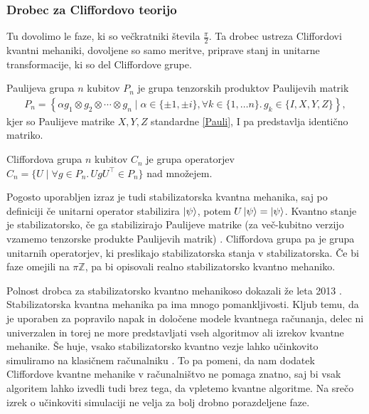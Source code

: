 \documentclass[mat1]{fmfdelo}
\newcommand{\Z}{\mathbb Z}
\newcommand{\tranp}{\top}
\newcommand{\sep}{\ensuremath{.\,}}
\begin{document}
\subsubsection{Drobec za Cliffordovo teorijo}
Tu dovolimo le faze, ki so večkratniki števila \(\frac\pi2\). Ta drobec ustreza Cliffordovi kvantni mehaniki, dovoljene so samo meritve, priprave stanj in unitarne transformacije, ki so del Cliffordove grupe.
\begin{definicija}
    Paulijeva grupa \(n\) kubitov \(P_n\) je grupa tenzorskih produktov Paulijevih matrik
    \begin{align*}
        P_n = \left\{\alpha g_1\otimes g_2\otimes\cdots\otimes g_n \mid \alpha\in\{\pm 1, \pm i\}, \forall k\in\{1,\ldots n\}\sep g_k\in \{I,X,Y,Z\}\right\},
    \end{align*}
    kjer so Paulijeve matrike \(X,Y,Z\) standardne \ref{Pauli}, I pa predstavlja identično matriko.
\end{definicija}
\begin{definicija}
    Cliffordova grupa \(n\) kubitov \(C_n\) je grupa operatorjev \(C_n=\{U\mid \forall g\in P_n\sep UgU^\tranp\in P_n\}\) nad množejem.
\end{definicija}
Pogosto uporabljen izraz je tudi stabilizatorska kvantna mehanika, saj po definiciji če unitarni operator stabilizira \(\ket \psi\), potem \(U\ket\psi = \ket\psi\). Kvantno stanje je stabilizatorsko, če ga stabilizirajo Paulijeve matrike (za več-kubitno verzijo vzamemo tenzorske produkte Paulijevih matrik) \cite{Backens1}. Cliffordova grupa pa je grupa unitarnih operatorjev, ki preslikajo stabilizatorska stanja v stabilizatorska. Če bi faze omejili na \(\pi\Z\), pa bi opisovali realno stabilizatorsko kvantno mehaniko.

Polnost drobca za stabilizatorsko kvantno mehanikoso dokazali že leta 2013 \cite{Backens1}. Stabilizatorska kvantna mehanika pa ima mnogo pomankljivosti. Kljub temu, da je uporaben za popravilo napak in določene modele kvantnega računanja, delec ni univerzalen in torej ne more predstavljati vseh algoritmov ali izrekov kvantne mehanike. Še huje, vsako stabilizatorsko kvantno vezje lahko učinkovito simuliramo na klasičnem računalniku \cite{Aaronson_2004}. To pa pomeni, da nam dodatek Cliffordove kvantne mehanike v računalništvo ne pomaga znatno, saj bi vsak algoritem lahko izvedli tudi brez tega, da vpletemo kvantne algoritme. Na srečo izrek o učinkoviti simulaciji ne velja za bolj drobno porazdeljene faze.
\end{document}
